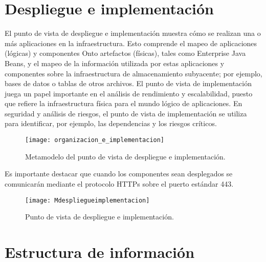 
\section{Despliegue e implementación}
El punto de vista de despliegue e implementación muestra cómo se realizan una o más aplicaciones en la infraestructura. Esto comprende el mapeo de aplicaciones (lógicas) y componentes Onto artefactos (físicas), tales como Enterprise Java Beans, y el mapeo de la información utilizada por estas aplicaciones y componentes sobre la infraestructura de almacenamiento subyacente; por ejemplo, bases de datos o tablas de otros archivos. El punto de vista de implementación juega un papel importante en el análisis de rendimiento y escalabilidad, puesto que refiere la infraestructura física para el mundo lógico de aplicaciones. En seguridad y análisis de riesgos, el punto de vista de implementación se utiliza para identificar, por ejemplo, las dependencias y los riesgos críticos. 

\begin{figure}[H]
\centering
\texttt{[image: organizacion\_e\_implementacion]}
\caption{Metamodelo del punto de vista de despliegue e implementación.}
\end{figure}


Es importante destacar que cuando los componentes sean desplegados se comunicarán mediante el protocolo HTTPs sobre el puerto estándar 443.

\begin{figure}[H]
\centering
\texttt{[image: Mdespliegueimplementacion]}
\caption{Punto de vista de despliegue e implementación.}
\end{figure}

\section{Estructura de información}

